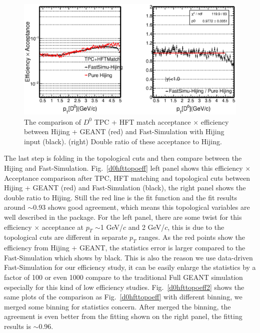 \begin{figure}[htbp]
\centering
\includegraphics[keepaspectratio,width=1.0\textwidth]{figure/Run14_D0HFT/Physics_FastHijingVsPureHijing_HFTRatio2.eps}
\caption{The comparison of $D^0$ TPC + HFT match acceptance $\times$ efficiency between Hijing + GEANT (red) and Fast-Simulation with Hijing input (black). (right) Double ratio of these acceptance to Hijing.}
\label{d0hftmatcheff}
\end{figure}

The last step is folding in the topological cuts and then compare between the Hijing and Fast-Simulation. Fig.~\ref{d0hfttopoeff} left panel shows this efficiency $\times$ Acceptance comparison after TPC, HFT matching and topological cuts between Hijing + GEANT (red) and Fast-Simulation (black), the right panel shows the double ratio to Hijing. Still the red line is the fit function and the fit results around $\sim$0.93 shows good agreement, which means this topological variables are well described in the package. For the left panel, there are some twist for this efficiency $\times$ acceptance at $p_T$ $\sim$1 GeV/$c$ and 2 GeV/$c$, this is due to the topological cuts are different in separate $p_T$ ranges. As the red points show the efficiency from Hijing + GEANT, the statistics error is larger compared to the Fast-Simulation which shows by black. This is also the reason we use data-driven Fast-Simulation for our efficiency study, it can be easily enlarge the statistics by a factor of 100 or even 1000 compare to the traditional Full GEANT simulation especially for this kind of low efficiency studies. Fig.~\ref{d0hfttopoeff2} shows the same plots of the comparison as Fig.~\ref{d0hfttopoeff} with different binning, we merged some binning for statistics concern. After merged the binning, the agreement is even better from the fitting shown on the right panel, the fitting results is $\sim$0.96.

